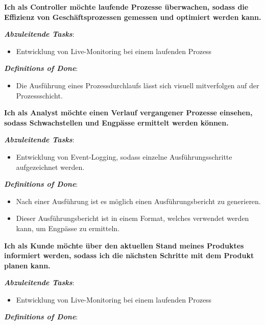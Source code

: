 \noindent \textbf{Ich als Controller möchte laufende Prozesse überwachen, sodass die Effizienz von Geschäftsprozessen gemessen und optimiert werden kann.}

\textbf{\textit{Abzuleitende Tasks}}:

\begin{itemize}
    \item Entwicklung von Live-Monitoring bei einem laufenden Prozess 
\end{itemize}

\textbf{\textit{Definitions of Done}}:

\begin{itemize}
    \item Die Ausführung eines Prozessdurchlaufs lässt sich visuell mitverfolgen auf der Prozessschicht.
\end{itemize}


\noindent \textbf{Ich als Analyst möchte einen Verlauf vergangener Prozesse einsehen, sodass Schwachstellen und Engpässe ermittelt werden können.}

\textbf{\textit{Abzuleitende Tasks}}:

\begin{itemize}
    \item Entwicklung von Event-Logging, sodass einzelne Ausführungsschritte aufgezeichnet werden.
\end{itemize}

\textbf{\textit{Definitions of Done}}:

\begin{itemize}
    \item Nach einer Ausführung ist es möglich einen Ausführungsbericht zu generieren.
    \item Dieser Ausführungsbericht ist in einem Format, welches verwendet werden kann, um Engpässe zu ermitteln.
\end{itemize}


\noindent \textbf{Ich als Kunde möchte über den aktuellen Stand meines Produktes informiert werden, sodass ich die nächsten Schritte mit dem Produkt planen kann.}

\textbf{\textit{Abzuleitende Tasks}}:

\begin{itemize}
    \item Entwicklung von Live-Monitoring bei einem laufenden Prozess 
\end{itemize}

\textbf{\textit{Definitions of Done}}:

